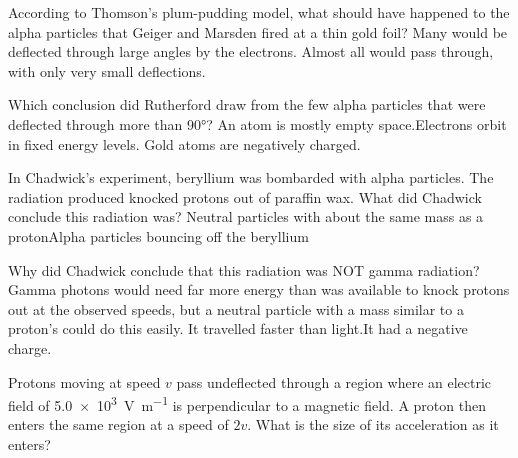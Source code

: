 \begin{quizq}{}
According to Thomson's plum-pudding model, what should have happened to the alpha particles that Geiger
and Marsden fired at a thin gold foil?
  {Many would be deflected through large angles by the electrons.}
  {Almost all would pass through, with only very small deflections.}
\end{quizq}

\begin{quizq}{}
Which conclusion did Rutherford draw from the few alpha particles that were deflected through more
than \ang{90}?
  {An atom is mostly empty space.}{Electrons orbit in fixed energy levels.}
  {Gold atoms are negatively charged.}
\end{quizq}

\begin{quizq}{}
In Chadwick's experiment, beryllium was bombarded with alpha particles. The radiation produced knocked
protons out of paraffin wax. What did Chadwick conclude this radiation was?
  {Neutral particles with about the same mass as a proton}{Alpha particles bouncing off the beryllium}
\end{quizq}

\begin{quizq}{}
Why did Chadwick conclude that this radiation was NOT gamma radiation?
  {Gamma photons would need far more energy than was available to knock protons out at the observed
   speeds, but a neutral particle with a mass similar to a proton's could do this easily.}
  {It travelled faster than light.}{It had a negative charge.}
\end{quizq}

\begin{quizq}{}
Protons moving at speed $v$ pass undeflected through a region where an electric field of
\qty{5.0e3}{V.m^{-1}} is perpendicular to a magnetic field. A proton then enters the same region at a speed
of $2v$. What is the size of its acceleration as it enters?
\end{quizq}

